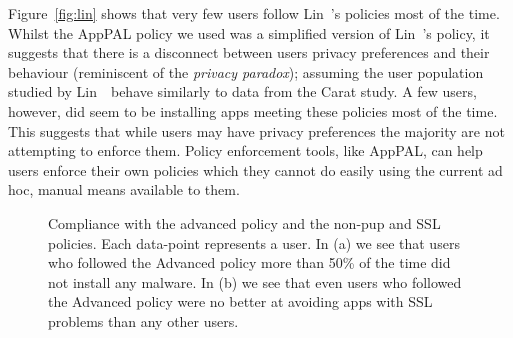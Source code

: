 \documentclass[]{llncs}
\begin{document}
Figure~\ref{fig:lin} shows that very few users follow Lin~\etal's policies most of the time.
Whilst the AppPAL policy we used was a simplified version of Lin~\etal's policy, it suggests that there is a disconnect between users privacy preferences and their behaviour (reminiscent of the \emph{privacy paradox}); assuming the user population studied by Lin~\etal~behave similarly to data from the Carat study.
A few users, however, did seem to be installing apps meeting these policies most of the time.
This suggests that while users may have privacy preferences the majority are not attempting to enforce them.
Policy enforcement tools, like AppPAL, can help users enforce their own policies which they cannot do easily using the current ad hoc, manual  means available to them.

\begin{figure}\centering
    \caption{Compliance with the advanced policy and the non-\ac{pup} and SSL policies.  Each data-point represents a user.  In (a) we see that users who followed the Advanced policy more than 50\% of the time did not install any malware.  In (b) we see that even users who followed the Advanced policy were no better at avoiding apps with SSL problems than any other users.}
  \label{fig:versus}
\end{figure}
\end{document}
